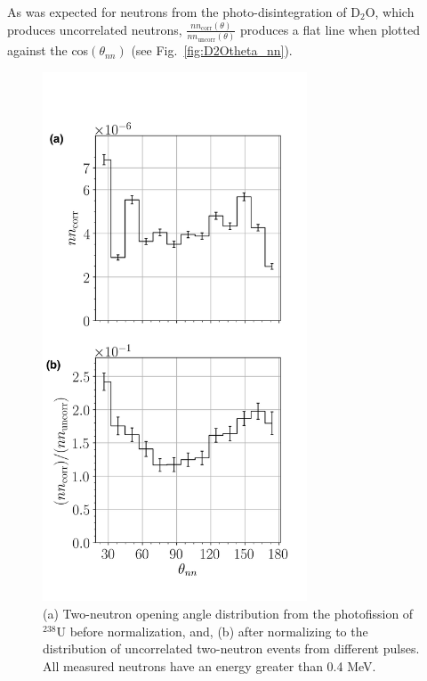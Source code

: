 As was expected for neutrons from the photo-disintegration of D$_{2}$O, which produces uncorrelated neutrons,  $\frac{nn_{\text{corr}}(\theta)}{nn_{\text{uncorr}}(\theta)}$ produces a flat line when plotted against the cos$(\theta_{nn})$ (see Fig.~\ref{fig:D2Otheta_nn}).
\begin{figure}[]
\centering
    \includegraphics[width=0.7\textwidth]{Content/Methods/SPDPNormalization.png}
    \caption{(a) Two-neutron opening angle distribution from the photofission of $^{238}$U before normalization, and, (b) after normalizing to the distribution of uncorrelated two-neutron events from different pulses.
    All measured neutrons have an energy greater than 0.4 MeV.}
    \label{fig:SPDPNormalization}
\end{figure}
